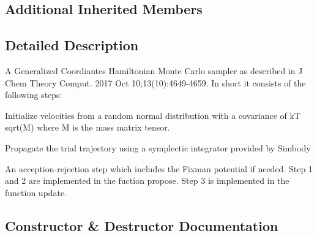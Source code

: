 \subsection*{Additional Inherited Members}


\subsection{Detailed Description}
A Generalized Coordiantes Hamiltonian Monte Carlo sampler as described in J Chem Theory Comput. 2017 Oct 10;13(10)\+:4649-\/4659. In short it consists of the following steps\+:
\begin{DoxyEnumerate}
\item Initialize velocities from a random normal distribution with a covariance of kT sqrt(\+M) where M is the mass matrix tensor.
\item Propagate the trial trajectory using a symplectic integrator provided by Simbody
\item An acception-\/rejection step which includes the Fixman potential if needed. Step 1 and 2 are implemented in the fuction propose. Step 3 is implemented in the function update. 
\end{DoxyEnumerate}

\subsection{Constructor \& Destructor Documentation}
